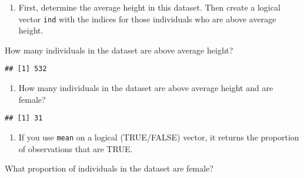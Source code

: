 \documentclass[]{article}
\newenvironment{Shaded}{\begin{snugshade}}{\end{snugshade}}
\newcommand{\KeywordTok}[1]{\textcolor[rgb]{0.13,0.29,0.53}{\textbf{#1}}}
\newcommand{\NormalTok}[1]{#1}
\newcommand{\OperatorTok}[1]{\textcolor[rgb]{0.81,0.36,0.00}{\textbf{#1}}}
\newcommand{\StringTok}[1]{\textcolor[rgb]{0.31,0.60,0.02}{#1}}
\providecommand{\tightlist}{%
  \setlength{\itemsep}{0pt}\setlength{\parskip}{0pt}}
\begin{document}
\begin{enumerate}
\def\labelenumi{\arabic{enumi}.}
\tightlist
\item
  First, determine the average height in this dataset. Then create a
  logical vector \texttt{ind} with the indices for those individuals who
  are above average height.
\end{enumerate}

How many individuals in the dataset are above average height?

\begin{Shaded}
\end{Shaded}

\begin{verbatim}
## [1] 532
\end{verbatim}

\begin{enumerate}
\def\labelenumi{\arabic{enumi}.}
\setcounter{enumi}{1}
\tightlist
\item
  How many individuals in the dataset are above average height and are
  female?
\end{enumerate}

\begin{Shaded}
\end{Shaded}

\begin{verbatim}
## [1] 31
\end{verbatim}

\begin{enumerate}
\def\labelenumi{\arabic{enumi}.}
\setcounter{enumi}{2}
\tightlist
\item
  If you use \texttt{mean} on a logical (TRUE/FALSE) vector, it returns
  the proportion of observations that are TRUE.
\end{enumerate}

What proportion of individuals in the dataset are female?

\begin{Shaded}
\end{Shaded}
\end{document}
